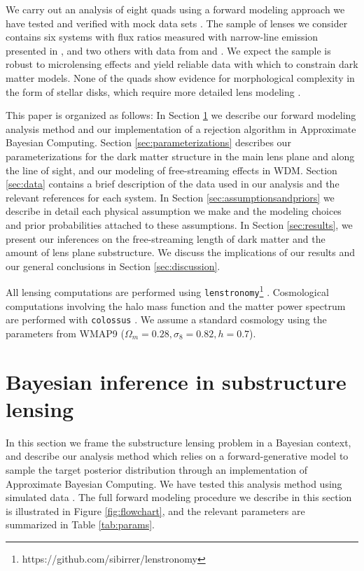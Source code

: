 We carry out an analysis of eight quads using a forward modeling approach we have tested and verified with mock data sets \cite{Gilman++18,Gilman++19}. The sample of lenses we consider contains six systems with flux ratios measured with narrow-line emission presented in \cite{Nierenberg++19}, and two others with data from \cite{Nierenberg++14} and \cite{Nierenberg++17}. We expect the sample is robust to microlensing effects and yield reliable data with which to constrain dark matter models. None of the quads show evidence for morphological complexity in the form of stellar disks, which require more detailed lens modeling \cite{Hsueh++16,Gilman++17,Hsueh++17}. 

This paper is organized as follows: In Section \ref{sec:inference} we describe our forward modeling analysis method and our implementation of a rejection algorithm in Approximate Bayesian Computing. Section \ref{sec:parameterizations} describes our parameterizations for the dark matter structure in the main lens plane and along the line of sight, and our modeling of free-streaming effects in WDM. Section \ref{sec:data} contains a brief description of the data used in our analysis and the relevant references for each system. In Section \ref{sec:assumptionsandpriors} we describe in detail each physical assumption we make and the modeling choices and prior probabilities attached to these assumptions. In Section \ref{sec:results}, we present our inferences on the free-streaming length of dark matter and the amount of lens plane substructure. We discuss the implications of our results and our general conclusions in Section \ref{sec:discussion}. 

All lensing computations are performed using {\tt{lenstronomy}}\footnote{https://github.com/sibirrer/lenstronomy} \cite{BirrerAmara18}. Cosmological computations involving the halo mass function and the matter power spectrum are performed with {\tt{colossus}} \cite{Diemer17}. We assume a standard cosmology using the parameters from WMAP9 \cite{WMAP9cosmo} ($\Omega_m = 0.28, \sigma_8 = 0.82, h=0.7$).  

\section{Bayesian inference in substructure lensing}
\label{sec:inference}
In this section we frame the substructure lensing problem in a Bayesian context, and describe our analysis method which relies on a forward-generative model to sample the target posterior distribution through an implementation of Approximate Bayesian Computing. We have tested this analysis method using simulated data \cite{Gilman++18,Gilman++19}. The full forward modeling procedure we describe in this section is illustrated in Figure \ref{fig:flowchart}, and the relevant parameters are summarized in Table \ref{tab:params}. 

